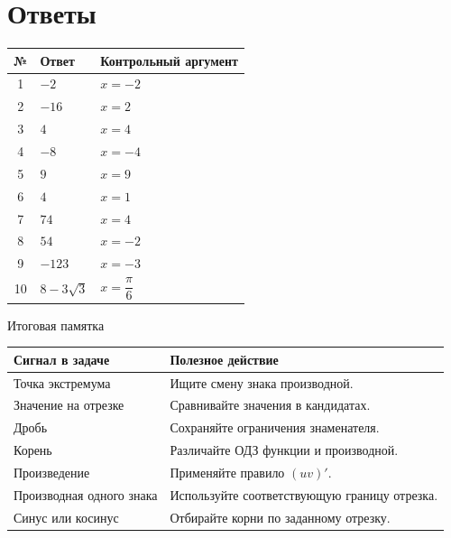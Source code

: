 \documentclass[a4paper,12pt]{article}
\begin{document}
\section*{\textcolor{darkaccent}{Ответы}}
\begin{center}
\renewcommand{\arraystretch}{1.35}
\begin{tabularx}{.88\linewidth}{@{}clX@{}}\toprule
№ & Ответ & Контрольный аргумент \\ \midrule
1 &$-2$&$x=-2$\\
2 &$-16$&$x=2$\\
3 &$4$&$x=4$\\
4 &$-8$&$x=-4$\\
5 &$9$&$x=9$\\
6 &$4$&$x=1$\\
7 &$74$&$x=4$\\
8 &$54$&$x=-2$\\
9 &$-123$&$x=-3$\\
10 &$8-3\sqrt3$&$x=\dfrac\pi6$\\
\bottomrule
\end{tabularx}
\end{center}
\bigskip
\begin{center}\textcolor{darkaccent}{\large Итоговая памятка}\end{center}
\begin{tabularx}{\linewidth}{@{}p{.40\linewidth}X@{}}
\toprule Сигнал в задаче & Полезное действие\\\midrule
Точка экстремума & Ищите смену знака производной.\\
Значение на отрезке & Сравнивайте значения в кандидатах.\\
Дробь & Сохраняйте ограничения знаменателя.\\
Корень & Различайте ОДЗ функции и производной.\\
Произведение & Применяйте правило $(uv)'$.\\
Производная одного знака & Используйте соответствующую границу отрезка.\\
Синус или косинус & Отбирайте корни по заданному отрезку.\\
\bottomrule
\end{tabularx}
\end{document}
